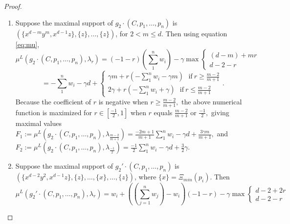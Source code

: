 \documentclass{amsart}
\numberwithin{equation}{section}
\theoremstyle{definition}
\begin{document}
\begin{proof}
\begin{enumerate}[label= (Case \arabic*):]
    \item Suppose the maximal support of $g_2 \cdot (C, p_1, \dots , p_n)$ is $(\{x^{d-m}y^m, x^{d-1}z\}, \{z\}, \dots , \{z\})$, for $2 < m \leq d$. Then using equation \ref{eq:mu},
    $$\mu^L (g_2 \cdot (C, p_1, \dots , p_n), \lambda_r) = (-1-r) (\sum_1^n w_i) - \gamma \max \begin{cases} (d-m) + mr \\
        d-2-r
    \end{cases}$$
    $$= - \sum_1^n w_i - \gamma d + \begin{cases}
       \gamma m + r(- \sum_1^n w_i - \gamma m)  \ \ \ \text{if} \ r \geq \frac{m-2}{m+1} \\
         2 \gamma  + r(- \sum_1^n w_i + \gamma)\ \ \ \text{if} \ r \leq \frac{m-2}{m+1}
    \end{cases}.$$
Because the coefficient of $r$ is negative when $r \geq \frac{m-2}{m+1},$ the above numerical function is maximized for $r \in [\frac{-1}{2}, 1]$ when $r$ equals $\frac{m-2}{m+1}$ or $\frac{-1}{2},$ giving maximal values \\
 $F_1 := \mu^L (g_2 \cdot (C, p_1, \dots , p_n), \lambda_{\frac{m-2}{m+1}} ) = \frac{-2m+1}{m+1} \sum_1^n w_i - \gamma d + \frac{ 3 \gamma m}{m+1}, $ and \\
 $F_2 := \mu^L (g_2 \cdot (C, p_1, \dots , p_n), \lambda_{\frac{-1}{2}} ) = \frac{-1}{2}\sum_1^n w_i - \gamma d + \frac{3}{2} \gamma .$




\item Suppose the maximal support of $g_2' \cdot (C, p_1, \dots , p_n)$ is $(\{x^{d-2}y^2, x^{d-1}z\}, \{z\}, \dots , \{x\}, \dots , \{z\})$, where $\{x\} = \Xi_{min}(p_i)$. Then 
$$\mu^L (g_2' \cdot (C, p_1, \dots , p_n), \lambda_r) = w_i + ((\sum_{j=1}^n w_j) - w_i)(-1-r) - \gamma \max \begin{cases}
    d-2 +2r \\
    d-2-r
\end{cases}$$



\end{enumerate}
\end{proof}
\end{document}
